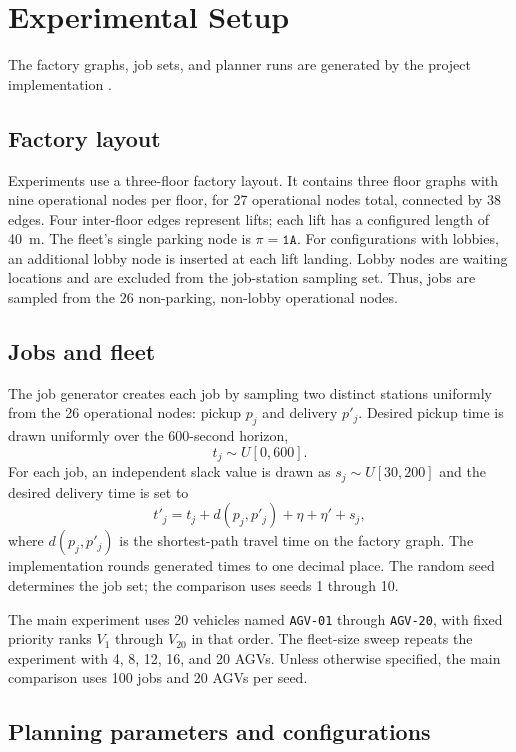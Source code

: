 \section{Experimental Setup}
\label{sec:experimental-setup}

The factory graphs, job sets, and planner runs are generated by the project
implementation \cite{projectRepo}.

\subsection{Factory layout}

Experiments use a three-floor factory layout. It contains
three floor graphs with nine operational nodes per floor, for 27 operational
nodes total, connected by 38 edges. Four inter-floor edges represent lifts;
each lift has a configured length of 40~m. The fleet's single parking node is
$\pi=\texttt{1A}$. For configurations with lobbies, an additional lobby node
is inserted at each lift landing. Lobby nodes are waiting locations and are
excluded from the job-station sampling set. Thus, jobs are sampled from the
26 non-parking, non-lobby operational nodes.

\subsection{Jobs and fleet}

The job generator creates each job by sampling two distinct
stations uniformly from the 26 operational nodes: pickup $p_j$ and delivery
$p'_j$. Desired pickup time is drawn uniformly over the 600-second horizon,
\[
  t_j\sim U[0,600].
\]
For each job, an independent slack value is drawn as $s_j\sim U[30,200]$ and
the desired delivery time is set to
\[
  t'_j=t_j+d(p_j,p'_j)+\eta+\eta'+s_j,
\]
where $d(p_j,p'_j)$ is the shortest-path travel time on the factory graph.
The implementation rounds generated times to one decimal place. The random
seed determines the job set; the comparison uses seeds 1 through 10.

The main experiment uses 20 vehicles named \texttt{AGV-01} through
\texttt{AGV-20}, with fixed priority ranks $V_1$ through $V_{20}$ in that
order. The fleet-size sweep repeats the experiment with 4, 8, 12, 16, and 20
AGVs. Unless otherwise specified, the main comparison uses 100 jobs and 20
AGVs per seed.

\subsection{Planning parameters and configurations}

